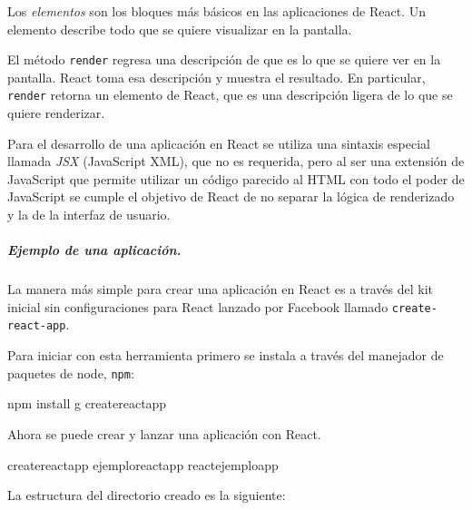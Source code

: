 Los \textit{elementos} son los bloques más básicos en las aplicaciones de React. Un elemento
describe todo que se quiere visualizar en la pantalla.

%
\begin{sphinxVerbatim}[commandchars=\\\{\}]
    
\end{sphinxVerbatim}


El método \texttt{render} regresa una descripción
de que es lo que se quiere ver en la pantalla. React
toma esa descripción y muestra el resultado. En
particular, \texttt{render} retorna un elemento de React,
que es una descripción ligera de lo que se quiere 
renderizar.

Para el desarrollo de una aplicación en React se utiliza
una sintaxis especial llamada \textit{JSX} (JavaScript XML), que no
es requerida, pero al ser una extensión de JavaScript que permite
utilizar un código parecido al HTML con todo el poder de JavaScript
se cumple el objetivo de React de no separar la lógica de renderizado
y la de la interfaz de usuario.


\subparagraph{Ejemplo de una aplicación.}

La manera más simple para crear una aplicación en
React es a través del kit inicial sin
configuraciones para React lanzado por Facebook
llamado \texttt{create-react-app}.

Para iniciar con esta herramienta primero se instala a través del
manejador de paquetes de node, \texttt{npm}:

%
\begin{sphinxVerbatim}[commandchars=\\\{\}]
npm install \PYGZhy{}g create\PYGZhy{}react\PYGZhy{}app
\end{sphinxVerbatim}


Ahora se puede crear y lanzar una aplicación con React. 

%
\begin{sphinxVerbatim}[commandchars=\\\{\}]
create\PYGZhy{}react\PYGZhy{}app ejemplo\PYGZus{}react\PYGZus{}app
 react\PYGZus{}ejemplo\PYGZus{}app
\end{sphinxVerbatim}

La estructura del directorio creado es la siguiente:

